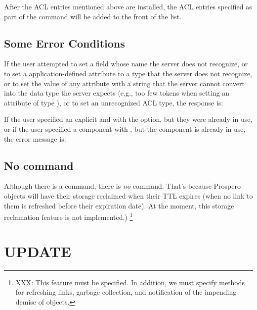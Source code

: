 After the ACL entries mentioned above are installed, the ACL
entries specified as part of the  command will
be added to the front of the list.

\subsection{Some Error Conditions}

If the user attempted to set a
field whose name the server does not recognize, or to set a
application-defined attribute to a type that the server does not recognize,
or to set the value of any attribute with a string that the server
cannot convert into the data type the server expects (e.g., too few
tokens when setting an attribute of type ), or to set an
unrecognized ACL type,
the response is:
\begin{command}
 
\end{command}
If the user specified an explicit  and
 with the  option, but they were
already in use, or if the user specified a component with
, but the component is already in use, the error message is:
\begin{command}
  \zoos{}\zooe
\end{command}


\subsection{No \protect{} command}

Although there is a  command, there is {\em no \/}
 command.  That's because Prospero objects will have
their storage reclaimed when their TTL expires (when no link to them
is refreshed before their expiration date).  At the moment, this
storage reclamation feature is not implemented.)  \footnote{XXX: This
feature must be specified.  In addition, we must specify methods for
refreshing links, garbage collection, and notification of the
impending demise of objects.}

\section{UPDATE}

\begin{command}
  \commandsize
     \zoms{}\zome
\end{command}

